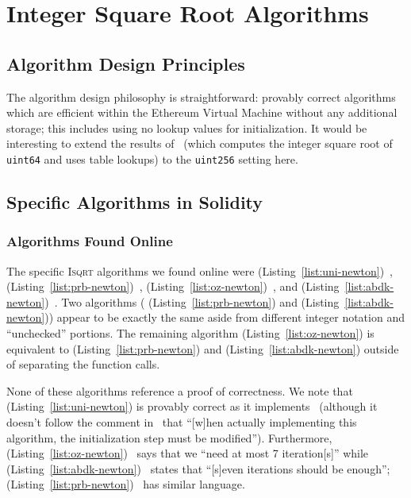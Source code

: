 \section{Integer Square Root Algorithms}

\subsection{Algorithm Design Principles}

The algorithm design philosophy is straightforward:
provably correct algorithms which are efficient within the
Ethereum Virtual Machine
without any additional storage;
this includes using no lookup values for initialization.
It would be interesting to extend the results of~\cite{FormalVerIsqrt}
(which computes the integer square root of \texttt{uint64}
and uses table lookups)
to the \texttt{uint256} setting here.

\subsection{Specific Algorithms in Solidity}

\subsubsection{Algorithms Found Online}

The specific \textsc{Isqrt} algorithms we found online were
\Uniswap{} (Listing~\ref{list:uni-newton})~\cite{uniswap-v2},
\prb{} (Listing~\ref{list:prb-newton})~\cite{prb-math},
\OpenZeppelin{} (Listing~\ref{list:oz-newton})~\cite{open-zeppelin}, and 
\abdk{} (Listing~\ref{list:abdk-newton})~\cite{abdk-consulting}.
Two algorithms
(\prb{} (Listing~\ref{list:prb-newton}) and
\abdk{} (Listing~\ref{list:abdk-newton}))
appear to be exactly the same aside from different integer notation
and ``unchecked'' portions.
The remaining algorithm
\OpenZeppelin{} (Listing~\ref{list:oz-newton}) is equivalent
to \prb{} (Listing~\ref{list:prb-newton}) and
\abdk{} (Listing~\ref{list:abdk-newton})
outside of separating the function calls.

None of these algorithms reference a proof of correctness.
We note that \Uniswap{} (Listing~\ref{list:uni-newton})
is provably correct as it implements~\cite[Algorithm 1.7.1]{cohen1993}
(although it doesn't follow the comment
in~\cite[Chapter 1.7, Remarks]{cohen1993} that
``[w]hen actually implementing this algorithm,
the initialization step must be modified'').
Furthermore,
\OpenZeppelin{} (Listing~\ref{list:oz-newton})~\cite{open-zeppelin}
says that we ``need at most 7 iteration[s]''
while 
\abdk{} (Listing~\ref{list:abdk-newton})~\cite{abdk-consulting} states that
``[s]even iterations should be enough'';
\prb{} (Listing~\ref{list:prb-newton})~\cite{prb-math}
has similar language.

